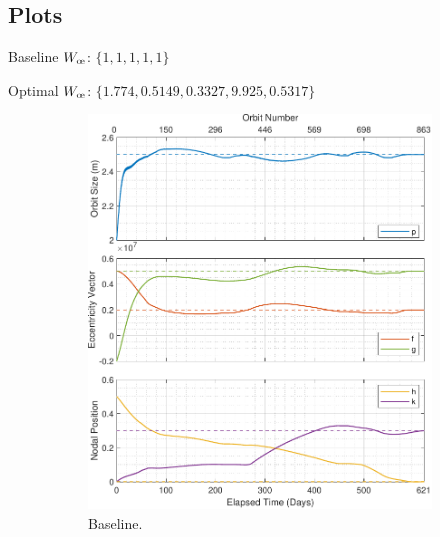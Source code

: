 \newpage
\subsection{Plots}
\label{sec:bench_case_plot}
Baseline \(W_{\moe}\): \(\{1, 1, 1, 1, 1\}\)


Optimal \(W_{\moe}\): \(\{1.774, 0.5149, 0.3327, 9.925, 0.5317\}\)

\begin{figure}[H]
    \centering
    \begin{subfigure}[t]{0.49\textwidth}
        \includegraphics[width=\textwidth]{figures/benchmark_transfer/orbital_elements.pdf}
        \caption{Baseline.}
        \label{fig:results_optim_a_1}
    \end{subfigure}
    \begin{subfigure}[t]{0.49\textwidth}

\end{subfigure}
\end{figure}
